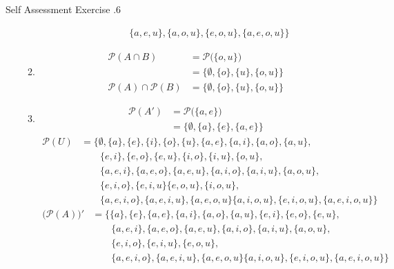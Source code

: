\documentclass[../notes.tex]{subfiles}
\begin{document}
\begin{exercise}{Self Assessment Exercise \thechapter.6}
\begin{enumerate}
\begin{enumerate}[label=(\alph*)]
\begin{align*}
                  & \qquad \{a, e, u\}, \{a, o, u\}, \{e, o, u\}, \{a, e, o, u\}\bigr\}
                \end{align*}
              \item \rule{0pt}{11pt} \vspace*{-25pt}
                \begin{align*}
                  \mathcal{P}(A \cap B) &= \mathcal{P}\bigl(\{o, u\}\bigr)\\
                  &= \bigl\{\emptyset, \{o\}, \{u\}, \{o, u\}\bigr\}\\
                  \mathcal{P}(A) \cap \mathcal{P}(B) &= \bigl\{\emptyset, \{o\}, \{u\}, \{o, u\}\bigr\}
                \end{align*}
              \item \rule{0pt}{11pt} \vspace*{-25pt}
                \begin{align*}
                  \mathcal{P}\left(A'\right) &= \mathcal{P}\bigl(\{a, e\}\bigr)\\
                  &= \bigl\{\emptyset, \{a\}, \{e\}, \{a, e\}\bigr\}
                \end{align*}
                \begin{align*}
                  \mathcal{P}(U) &= \bigl\{\emptyset, \{a\}, \{e\}, \{i\}, \{o\}, \{u\}, \{a, e\}, \{a, i\}, \{a, o\}, \{a, u\},\\
                  & \qquad \{e, i\}, \{e, o\}, \{e, u\}, \{i, o\}, \{i, u\}, \{o, u\},\\
                  & \qquad \{a, e, i\}, \{a, e, o\}, \{a, e, u\}, \{a, i, o\}, \{a, i, u\}, \{a, o, u\},\\
                  & \qquad \{e, i, o\}, \{e, i, u\} \{e, o, u\}, \{i, o, u\},\\
                  & \qquad \{a, e, i, o\}, \{a, e, i, u\}, \{a, e, o, u\} \{a, i, o, u\}, \{e, i, o, u\}, \{a, e, i, o, u\}\bigr\}
                \end{align*}
                \begin{align*}
                  \bigl(\mathcal{P}(A)\bigr)' &= \bigl\{\{a\}, \{e\}, \{a, e\}, \{a, i\}, \{a, o\}, \{a, u\}, \{e, i\}, \{e, o\}, \{e, u\},\\
                  & \qquad \{a, e, i\}, \{a, e, o\}, \{a, e, u\}, \{a, i, o\}, \{a, i, u\}, \{a, o, u\}, \\
                  & \qquad \{e, i, o\}, \{e, i, u\},  \{e, o, u\}, \\
                  & \qquad \{a, e, i, o\}, \{a, e, i, u\}, \{a, e, o, u\} \{a, i, o, u\}, \{e, i, o, u\}, \{a, e, i, o, u\}\bigr\}

\end{align*}
\end{enumerate}
\end{enumerate}
\end{exercise}
\end{document}
